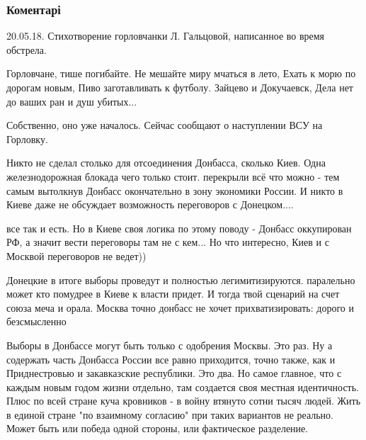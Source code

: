  
 
 
 
 
\subsubsection{Коментарі}

\begin{itemize} %

20.05.18. Стихотворение горловчанки Л. Гальцовой, написанное во время обстрела.

\obeycr
Горловчане, тише погибайте.
Не мешайте миру мчаться в лето,
Ехать к морю по дорогам новым,
Пиво заготавливать к футболу.
Зайцево и Докучаевск,
Дела нет до ваших ран и душ убитых...
\restorecr


Собственно, оно уже началось. Сейчас сообщают о наступлении ВСУ на Горловку.


Никто не сделал столько для отсоединения Донбасса, сколько Киев. Одна
железнодорожная блокада чего только стоит. перекрыли всё что можно - тем самым
вытолкнув Донбасс окончательно в зону экономики России. И никто в Киеве даже не
обсуждает возможность переговоров с Донецком....

\begin{itemize} %

все так и есть. Но в Киеве своя логика по этому поводу - Донбасс оккупирован
РФ, а значит вести переговоры там не с кем... Но что интересно, Киев и с
Москвой переговоров не ведет))


Донецкие в итоге выборы проведут и полностью легимитизируются. паралельно может
кто помудрее в Киеве к власти придет. И тогда твой сценарий на счет союза меча
и орала. Москва точно донбасс не хочет прихватизировать: дорого и безсмысленно


Выборы в Донбассе могут быть только с одобрения Москвы. Это раз. Ну а содержать
часть Донбасса России все равно приходится, точно также, как и Приднестровью и
закавказские республики. Это два. Но самое главное, что с каждым новым годом
жизни отдельно, там создается своя местная идентичность. Плюс по всей стране
куча кровников - в войну втянуто сотни тысяч людей. Жить в единой стране "по
взаимному согласию" при таких вариантов не реально. Может быть или победа одной
стороны, или фактическое разделение.


\end{itemize}
\end{itemize}
